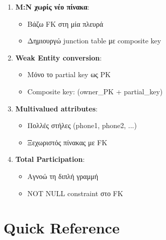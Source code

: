 \begin{warningbox}
\begin{enumerate}
    \item \textbf{M:N χωρίς νέο πίνακα}:
    \begin{itemize}
        \item[$\times$] Βάζω FK στη μία πλευρά
        \item[\checkmark] Δημιουργώ junction table με composite key
    \end{itemize}

    \item \textbf{Weak Entity conversion}:
    \begin{itemize}
        \item[$\times$] Μόνο το partial key ως PK
        \item[\checkmark] Composite key: (owner\_PK + partial\_key)
    \end{itemize}

    \item \textbf{Multivalued attributes}:
    \begin{itemize}
        \item[$\times$] Πολλές στήλες (phone1, phone2, ...)
        \item[\checkmark] Ξεχωριστός πίνακας με FK
    \end{itemize}

    \item \textbf{Total Participation}:
    \begin{itemize}
        \item[$\times$] Αγνοώ τη διπλή γραμμή
        \item[\checkmark] NOT NULL constraint στο FK
    \end{itemize}
\end{enumerate}
\end{warningbox}

\section{Quick Reference}

